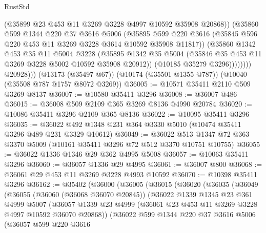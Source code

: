 \begin{lexlean}{RustStd}
\begin{coremodule}
                      (@35899 @23 @453 @11 @3269 @3228 @4997 @10592 @35908 @20868))
                    (@35860
                      @599
                      @1344
                      @220
                      @37
                      @3616
                      @5006
                      (@35895
                        @599
                        @220
                        @3616
                        (@35845 @596 @220 @453 @11 @3269 @3228 @3614 @10592 @35908 @11817))
                      (@35860
                        @1342
                        @453
                        @35
                        @11
                        @5004
                        @3228
                        (@35895
                          @1342
                          @35
                          @5004
                          (@35846 @35 @453 @11 @3269 @3228 @5002 @10592 @35908 @20912))
                        (@10185 @35279 @3296))))))))
          @20928)))
    (@13173 (@35497 @67))
    (@10174 (@35501 @1355 @787))
    (@10040 (@35508 @787 @1757 @8072 @3269))
@36005 := @10571 @35411 @2110 @509 @3269 @8137
@36007 := @10580 @35411 @3296
@36008 := @36007 @486
@36015 := @36008 @509 @2109 @365 @3269 @8136 @4990 @20784
@36020 := @10086 @35411 @3296 @2109 @365 @8136
@36022 := @10095 @35411 @3296
@36035 := @36022 @492 @1348 @231 @364 @3330 @5010 (@10474 @35411 @3296 @489 @231 @3329 @10612)
@36049 := @36022 @513 @1347 @72 @363 @3370 @5009 (@10161 @35411 @3296 @72 @512 @3370 @10751 @10755)
@36055 := @36022 @1336 @1346 @29 @362 @4995 @5008
@36057 := @10063 @35411 @3296
@36060 := @36057 @1336 @29 @4995
@36061 := @36007 @800
@36068 := @36061 @29 @453 @11 @3269 @3228 @4993 @10592
@36070 := @10398 @35411 @3296
@36162 := @35402
    (@36000
      (@36005
        (@36015
          (@36020
            (@36035
              (@36049
                (@36055
                  (@36060 (@36068 @36070 @20845))
                  (@36022
                    @1339
                    @1345
                    @23
                    @361
                    @4999
                    @5007
                    (@36057
                      @1339
                      @23
                      @4999
                      (@36061 @23 @453 @11 @3269 @3228 @4997 @10592 @36070 @20868))
                    (@36022
                      @599
                      @1344
                      @220
                      @37
                      @3616
                      @5006
                      (@36057
                        @599
                        @220
                        @3616

\end{coremodule}
\end{lexlean}
